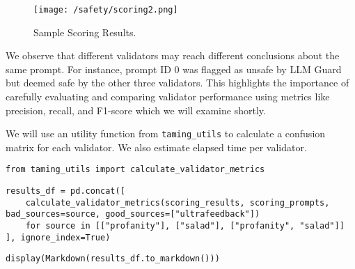\begin{figure}[H]
\texttt{[image: /safety/scoring2.png]}
\caption{Sample Scoring Results.}
\label{fig:scoring2}
\end{figure}

We observe that different validators may reach different conclusions about the same prompt. For instance, prompt ID 0 was flagged as unsafe by LLM Guard but deemed safe by the other three validators. This highlights the importance of carefully evaluating and comparing validator performance using metrics like precision, recall, and F1-score which we will examine shortly.

We will use an utility function from \texttt{taming\_utils} to calculate a confusion matrix for each validator. We also estimate elapsed time per validator.

\begin{verbatim}
from taming_utils import calculate_validator_metrics
\end{verbatim}

\begin{verbatim}
results_df = pd.concat([
    calculate_validator_metrics(scoring_results, scoring_prompts, bad_sources=source, good_sources=["ultrafeedback"]) 
    for source in [["profanity"], ["salad"], ["profanity", "salad"]]
], ignore_index=True)
\end{verbatim}

\begin{verbatim}
display(Markdown(results_df.to_markdown()))
\end{verbatim}

